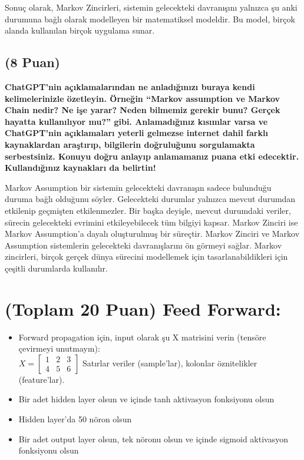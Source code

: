 \documentclass[11pt]{article}
\begin{document}
Sonuç olarak, Markov Zincirleri, sistemin gelecekteki davranışını yalnızca şu anki durumuna bağlı olarak modelleyen bir matematiksel modeldir. Bu model, birçok alanda kullanılan birçok uygulama sunar.

\subsection{(8 Puan)} \textbf{ChatGPT’nin açıklamalarından ne anladığınızı buraya kendi kelimelerinizle özetleyin. Örneğin ``Markov assumption ve Markov Chain nedir? Ne işe yarar? Neden bilmemiz gerekir bunu? Gerçek hayatta kullanılıyor mu?'' gibi. Anlamadığınız kısımlar varsa ve ChatGPT’nin açıklamaları yeterli gelmezse internet dahil farklı kaynaklardan araştırıp, bilgilerin doğruluğunu sorgulamakta serbestsiniz. Konuyu doğru anlayıp anlamamanız puana etki edecektir. Kullandığınız kaynakları da belirtin!}

Markov Assumption bir sistemin gelecekteki davranışın sadece bulunduğu duruma bağlı olduğunu söyler. Gelecekteki durumlar yalnızca mevcut durumdan etkilenip geçmişten etkilenmezler. Bir başka deyişle, mevcut durumdaki veriler, sürecin gelecekteki evrimini etkileyebilecek tüm bilgiyi kapsar. Markov Zinciri ise Markov Assumption'a dayalı oluşturulmuş bir süreçtir. Markov Zinciri ve Markov Assumption sistemlerin gelecekteki davranışlarını ön görmeyi sağlar.  Markov zincirleri, birçok gerçek dünya sürecini modellemek için tasarlanabildikleri için çeşitli durumlarda kullanılır.

\section{(Toplam 20 Puan) Feed Forward:}
 
\begin{itemize}
    \item Forward propagation için, input olarak şu X matrisini verin (tensöre çevirmeyi unutmayın):\\
    $X = \begin{bmatrix}
        1 & 2 & 3\\
        4 & 5 & 6
        \end{bmatrix}$
    Satırlar veriler (sample'lar), kolonlar öznitelikler (feature'lar).
    \item Bir adet hidden layer olsun ve içinde tanh aktivasyon fonksiyonu olsun
    \item Hidden layer'da 50 nöron olsun
    \item Bir adet output layer olsun, tek nöronu olsun ve içinde sigmoid aktivasyon fonksiyonu olsun
\end{itemize}
\end{document}
